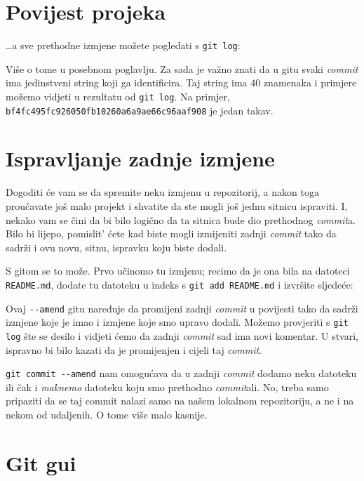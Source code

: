 \section*{Povijest projeka}

\dots{}a sve prethodne izmjene možete pogledati s \verb+git log+:



Više o tome u posebnom poglavlju. 
Za sada je važno znati da u gitu svaki \emph{commit} ima jedinstveni string koji ga identificira.
Taj string ima 40 znamenaka i primjere možemo vidjeti u rezultatu od \verb+git log+.
Na primjer, \verb+bf4fc495fc926050fb10260a6a9ae66c96aaf908+ je jedan takav.

\section*{Ispravljanje zadnje izmjene}

Dogoditi će vam se da spremite neku izmjenu u repozitorij, a nakon toga proučavate još malo projekt i shvatite da ste mogli još jednu sitnicu ispraviti.
I, nekako vam se čini da bi bilo logično da ta sitnica bude dio prethodnog \emph{commit}a.
Bilo bi lijepo, pomislit' ćete kad biste mogli izmijeniti zadnji \emph{commit} tako da sadrži i ovu novu, sitnu, ispravku koju biste dodali.

S gitom se to može.
Prvo učinomo tu izmjenu; recimo da je ona bila na datoteci \verb+README.md+, dodate tu datoteku u indeks s \verb+git add README.md+ i izvršite sljedeće:


Ovaj \verb+--amend+ gitu naređuje da promijeni zadnji \emph{commit} u povijesti tako da sadrži izmjene koje je imao i izmjene koje smo upravo dodali.
Možemo provjeriti s \verb+git log+ šte se desilo i vidjeti ćemo da zadnji \emph{commit} sad ima novi komentar.
U stvari, ispravno bi bilo kazati da je promijenjen i cijeli taj \emph{commit}.

\verb+git commit --amend+ nam omogućava da u zadnji \emph{commit} dodamo neku datoteku ili čak i \emph{maknemo} datoteku koju smo prethodno \emph{commit}ali. 
No, treba samo pripaziti da se taj commit nalazi samo na našem lokalnom repozitoriju, a ne i na nekom od udaljenih. 
O tome više malo kasnije.

\section*{Git gui}

